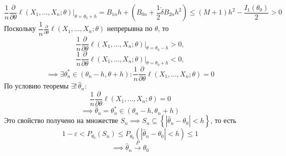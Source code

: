\documentclass[a4paper,11pt]{article}
\begin{document}
{    \[\frac{1}{n}\frac{\partial}{\partial\theta}\ell(X_1,\dots,X_n;\theta)\Bigg|_{\theta=\theta_0+h} = B_{1n}h + \left(B_{0n} + \frac{1}{2}\widetilde{\delta}B_{2n}h^2\right) \leq (M+1)h^2 - \frac{I_1(\theta_0)}{2} > 0\tag{32*}\]
    Поскольку $\dfrac{1}{n}\frac{\partial}{\partial\theta}\ell(X_1,\dots,X_n;\theta)$ непрерывна по $\theta$, то
    \[\frac{1}{n}\frac{\partial}{\partial\theta}\ell(X_1,\dots,X_n;\theta)\Bigg|_{\theta=\theta_0-h} > 0,\]
    \[\frac{1}{n}\frac{\partial}{\partial\theta}\ell(X_1,\dots,X_n;\theta)\Bigg|_{\theta=\theta_0+h} < 0,\]
    \[\implies \exists \theta_n^* \in \left(\theta_n - h, \theta + h\right): \frac{1}{n}\frac{\partial}{\partial\theta}\ell(X_1,\dots,X_n;\theta) = 0\]
    По условию теоремы $\exists!\,\widehat{\theta}_n$:
    \[\frac{1}{n}\frac{\partial}{\partial\theta}\ell(X_1,\dots,X_n;\theta) = 0 \tag{33*}\]
    \[\implies \widehat{\theta}_n = \theta_n^* \in \left(\theta_n - h, \theta_n + h\right)\]
    Это свойство получено на множестве $S_n \implies S_n \subseteq \left\{\left|\widehat{\theta}_n - \theta_0\right| < h\right\}$, то есть
    \[1 - \varepsilon < P_{\theta_0}(S_n) \leq P_{\theta_0}\left(\left|\widehat{\theta}_n - \theta_0\right| < h\right) \leq 1\]
    \[\implies \widehat{\theta}_n \xrightarrow{P}\theta_0\]\vspace{1cm}

}
\end{document}
